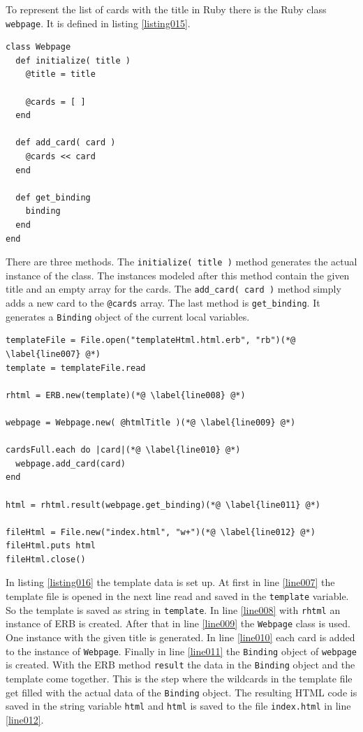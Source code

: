 To represent the list of cards with the title in Ruby there is the Ruby class \texttt{webpage}. It is defined in listing \ref{listing015}.

\begin{lstlisting}[aboveskip=1\baselineskip, caption=Generating HTML without a templating engine., label=listing015]
class Webpage
  def initialize( title )
    @title = title

    @cards = [ ]
  end

  def add_card( card )
    @cards << card
  end

  def get_binding
    binding
  end
end
\end{lstlisting}

There are three methods. The \lstinline{initialize( title )} method generates the actual instance of the class. The instances modeled after this method contain the given title and an empty array for the cards. The \lstinline{add_card( card )} method simply adds a new card to the \lstinline{@cards} array. The last method is \lstinline{get_binding}. It generates a \lstinline{Binding} object of the current local variables.

\begin{lstlisting}[aboveskip=1\baselineskip, caption=Generating HTML with ERB., label=listing016]
templateFile = File.open("templateHtml.html.erb", "rb")(*@ \label{line007} @*)
template = templateFile.read

rhtml = ERB.new(template)(*@ \label{line008} @*)

webpage = Webpage.new( @htmlTitle )(*@ \label{line009} @*)

cardsFull.each do |card|(*@ \label{line010} @*)
  webpage.add_card(card)
end

html = rhtml.result(webpage.get_binding)(*@ \label{line011} @*)

fileHtml = File.new("index.html", "w+")(*@ \label{line012} @*)
fileHtml.puts html
fileHtml.close()
\end{lstlisting}

In listing \ref{listing016} the template data is set up. At first in line \ref{line007} the template file is opened in the next line read and saved in the \lstinline{template} variable. So the template is saved as string in \lstinline{template}. In line \ref{line008} with \lstinline{rhtml} an instance of ERB is created. After that in line \ref{line009} the \lstinline{Webpage} class is used. One instance with the given title is generated. In line \ref{line010} each card is added to the instance of \lstinline{Webpage}. Finally in line \ref{line011} the \lstinline{Binding} object of \lstinline{webpage} is created. With the ERB method \lstinline{result} the data in the \lstinline{Binding} object and the template come together. This is the step where the wildcards in the template file get filled with the actual data of the \lstinline{Binding} object. The resulting HTML code is saved in the string variable \lstinline{html} and \lstinline{html} is saved to the file \texttt{index.html} in line \ref{line012}. 


